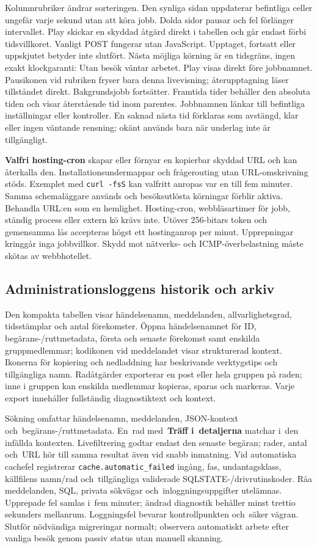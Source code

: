 \documentclass[11pt,a4paper]{article}
\newcommand{\ui}[1]{\textbf{#1}}
\newcommand{\codeword}[1]{\nolinkurl{#1}}
\begin{document}
Kolumnrubriker ändrar sorteringen. Den synliga sidan uppdaterar befintliga
celler ungefär varje sekund utan att köra jobb. Dolda sidor pausar och fel
förlänger intervallet. Play skickar en skyddad åtgärd direkt i tabellen och
går endast förbi tidsvillkoret. Vanligt POST fungerar utan JavaScript.
Upptaget, fortsatt eller uppskjutet betyder inte slutfört. Nästa möjliga körning
är en tidsgräns, ingen exakt klockgaranti: Utan besök väntar arbetet.
Play visas direkt före jobbnamnet. Pausikonen vid rubriken fryser bara denna
livevisning; återupptagning läser tillståndet direkt. Bakgrundsjobb fortsätter.
Framtida tider behåller den absoluta tiden och visar återstående tid inom
parentes.
Jobbnamnen länkar till befintliga inställningar eller kontroller. En saknad
nästa tid förklaras som avstängd, klar eller ingen väntande rensning;
okänt används bara när underlag inte är tillgängligt.

\ui{Valfri hosting-cron} skapar eller förnyar en kopierbar skyddad URL och
kan återkalla den. Installationsundermappar och frågerouting utan
URL-omskrivning stöds. Exemplet med \codeword{curl -fsS} kan valfritt anropas
var en till fem minuter. Samma schemaläggare används och besöksutlösta körningar
förblir aktiva. Behandla URL:en som en hemlighet. Hosting-cron, webbläsartimer
för jobb, ständig process eller extern kö krävs inte.
Utöver 256-bitars token och gemensamma lås accepteras högst ett hostinganrop
per minut. Upprepningar kringgår inga jobbvillkor. Skydd mot nätverks- och
ICMP-överbelastning måste skötas av webbhotellet.

\subsection{Administrationsloggens historik och arkiv}

Den kompakta tabellen visar händelsenamn, meddelanden, allvarlighetsgrad,
tidsstämplar och antal förekomster. Öppna händelsenamnet för ID,
begärans-/ruttmetadata, första och senaste förekomst samt enskilda
gruppmedlemmar; kodikonen vid meddelandet visar strukturerad kontext. Ikonerna
för kopiering och nedladdning har beskrivande verktygstips och tillgängliga
namn. Radåtgärder exporterar en post eller hela gruppen på raden; inne i gruppen
kan enskilda medlemmar kopieras, sparas och markeras. Varje export innehåller
fullständig diagnostiktext och kontext.

Sökning omfattar händelsenamn, meddelanden, JSON-kontext
och~begärans-/ruttmetadata. En~rad med~\ui{Träff i~detaljerna} matchar i~den
infällda kontexten. Livefiltrering godtar endast den senaste begäran; rader,
antal och~URL hör till samma resultat även vid snabb inmatning. Vid automatiska
cachefel registrerar \codeword{cache.automatic\_failed} ingång, fas,
undantagsklass, källfilens namn/rad och~tillgängliga validerade
SQLSTATE-/drivrutinskoder. Råa meddelanden, SQL, privata sökvägar
och~inloggningsuppgifter utelämnas. Upprepade fel samlas i~fem minuter; ändrad
diagnostik behåller minst trettio sekunders mellanrum. Loggningsfel bevarar
kontrollpunkten och~säker vägran. Slutför nödvändiga migreringar normalt;
observera automatiskt arbete efter vanliga besök genom passiv status utan
manuell skanning.
\end{document}
